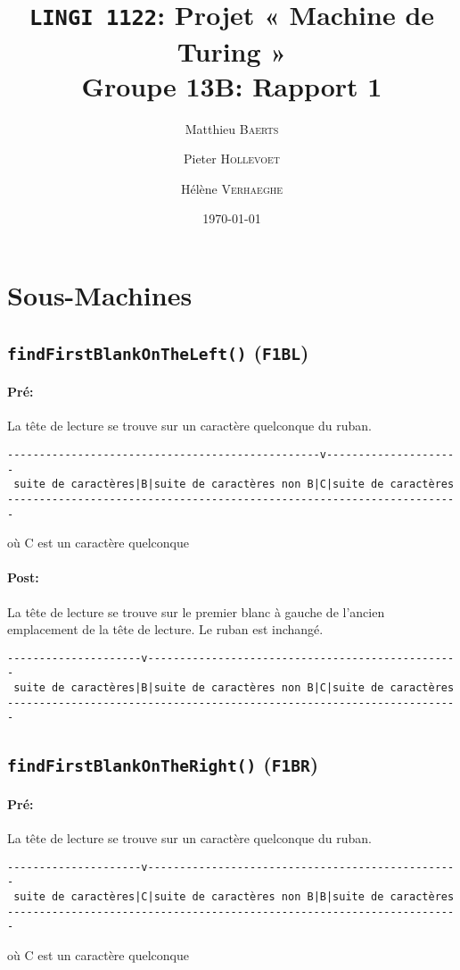 \documentclass[a4paper,11pt]{article}
\title{\texttt{LINGI 1122}: Projet « Machine de Turing » \\ {\large Groupe 13B: Rapport 1}}
\author{Matthieu \textsc{Baerts} \and Pieter \textsc{Hollevoet} \and Hélène \textsc{Verhaeghe}}
\date{\today}
\begin{document}
\maketitle
\section{Sous-Machines}
\subsection{\texttt{findFirstBlankOnTheLeft()} (\texttt{F1BL})}
\paragraph{Pré:} La tête de lecture se trouve sur un caractère quelconque du ruban.
\begin{verbatim}
-------------------------------------------------v---------------------
 suite de caractères|B|suite de caractères non B|C|suite de caractères
-----------------------------------------------------------------------
\end{verbatim}
où C est un caractère quelconque
\paragraph{Post:} La tête de lecture se trouve sur le premier blanc à gauche de l'ancien emplacement de la tête de lecture. Le ruban est inchangé.
\begin{verbatim}
---------------------v-------------------------------------------------
 suite de caractères|B|suite de caractères non B|C|suite de caractères
-----------------------------------------------------------------------
\end{verbatim}
\subsection{\texttt{findFirstBlankOnTheRight()} (\texttt{F1BR})}
\paragraph{Pré:} La tête de lecture se trouve sur un caractère quelconque du ruban.
\begin{verbatim}
---------------------v-------------------------------------------------
 suite de caractères|C|suite de caractères non B|B|suite de caractères
-----------------------------------------------------------------------
\end{verbatim}
où C est un caractère quelconque
\end{document}
